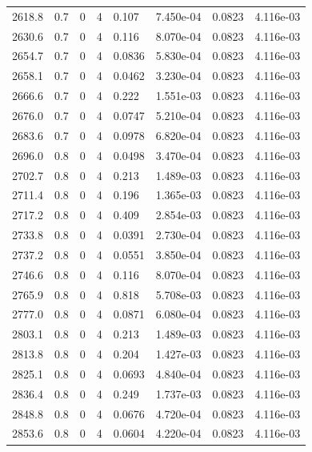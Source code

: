 \documentclass[preview]{standalone}
\begin{document}
{{{{{{{{{{{\begin{tabular}{L{1.2cm}C{1.2cm} C{0.3cm}C{0.5cm} C{1.4cm}C{1.4cm} C{1.4cm}C{1.4cm}}
  2618.8  &   0.7  & 0     &  4 &  0.107  & 7.450e-04  & 0.0823 &  4.116e-03   \\ 
  2630.6  &   0.7  & 0     &  4 &  0.116  & 8.070e-04  & 0.0823 &  4.116e-03   \\ 
  2654.7  &   0.7  & 0     &  4 &  0.0836  & 5.830e-04  & 0.0823 &  4.116e-03   \\ 
  2658.1  &   0.7  & 0     &  4 &  0.0462  & 3.230e-04  & 0.0823 &  4.116e-03   \\ 
  2666.6  &   0.7  & 0     &  4 &  0.222  & 1.551e-03  & 0.0823 &  4.116e-03   \\ 
  2676.0  &   0.7  & 0     &  4 &  0.0747  & 5.210e-04  & 0.0823 &  4.116e-03   \\ 
  2683.6  &   0.7  & 0     &  4 &  0.0978  & 6.820e-04  & 0.0823 &  4.116e-03   \\ 
  2696.0  &   0.8  & 0     &  4 &  0.0498  & 3.470e-04  & 0.0823 &  4.116e-03   \\ 
  2702.7  &   0.8  & 0     &  4 &  0.213  & 1.489e-03  & 0.0823 &  4.116e-03   \\ 
  2711.4  &   0.8  & 0     &  4 &  0.196  & 1.365e-03  & 0.0823 &  4.116e-03   \\ 
  2717.2  &   0.8  & 0     &  4 &  0.409  & 2.854e-03  & 0.0823 &  4.116e-03   \\ 
  2733.8  &   0.8  & 0     &  4 &  0.0391  & 2.730e-04  & 0.0823 &  4.116e-03   \\ 
  2737.2  &   0.8  & 0     &  4 &  0.0551  & 3.850e-04  & 0.0823 &  4.116e-03   \\ 
  2746.6  &   0.8  & 0     &  4 &  0.116  & 8.070e-04  & 0.0823 &  4.116e-03   \\ 
  2765.9  &   0.8  & 0     &  4 &  0.818  & 5.708e-03  & 0.0823 &  4.116e-03   \\ 
  2777.0  &   0.8  & 0     &  4 &  0.0871  & 6.080e-04  & 0.0823 &  4.116e-03   \\ 
  2803.1  &   0.8  & 0     &  4 &  0.213  & 1.489e-03  & 0.0823 &  4.116e-03   \\ 
  2813.8  &   0.8  & 0     &  4 &  0.204  & 1.427e-03  & 0.0823 &  4.116e-03   \\ 
  2825.1  &   0.8  & 0     &  4 &  0.0693  & 4.840e-04  & 0.0823 &  4.116e-03   \\ 
  2836.4  &   0.8  & 0     &  4 &  0.249  & 1.737e-03  & 0.0823 &  4.116e-03   \\ 
  2848.8  &   0.8  & 0     &  4 &  0.0676  & 4.720e-04  & 0.0823 &  4.116e-03   \\ 
  2853.6  &   0.8  & 0     &  4 &  0.0604  & 4.220e-04  & 0.0823 &  4.116e-03   \\ 

\end{tabular}}}}}}}}}}}}
\end{document}
